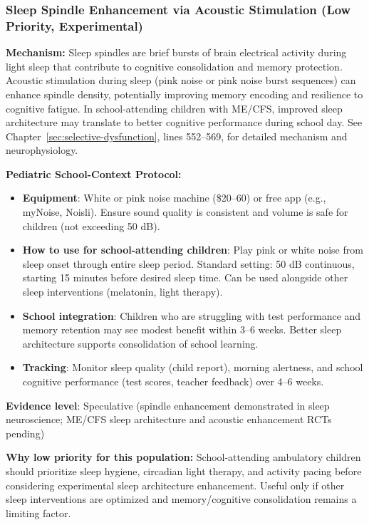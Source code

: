 \subsubsection{Sleep Spindle Enhancement via Acoustic Stimulation (Low Priority, Experimental)}

\begin{recommendation}
\label{rec:sleep-spindle-ped-ambulatory}

\textbf{Mechanism:} Sleep spindles are brief bursts of brain electrical activity during light sleep that contribute to cognitive consolidation and memory protection. Acoustic stimulation during sleep (pink noise or pink noise burst sequences) can enhance spindle density, potentially improving memory encoding and resilience to cognitive fatigue. In school-attending children with ME/CFS, improved sleep architecture may translate to better cognitive performance during school day. See Chapter~\ref{sec:selective-dysfunction}, lines 552--569, for detailed mechanism and neurophysiology.

\textbf{Pediatric School-Context Protocol:}

\begin{itemize}
    \item \textbf{Equipment}: White or pink noise machine (\$20--60) or free app (e.g., myNoise, Noisli). Ensure sound quality is consistent and volume is safe for children (not exceeding 50 dB).

    \item \textbf{How to use for school-attending children}: Play pink or white noise from sleep onset through entire sleep period. Standard setting: 50 dB continuous, starting 15 minutes before desired sleep time. Can be used alongside other sleep interventions (melatonin, light therapy).

    \item \textbf{School integration}: Children who are struggling with test performance and memory retention may see modest benefit within 3--6 weeks. Better sleep architecture supports consolidation of school learning.

    \item \textbf{Tracking}: Monitor sleep quality (child report), morning alertness, and school cognitive performance (test scores, teacher feedback) over 4--6 weeks.
\end{itemize}

\textbf{Evidence level}: Speculative (spindle enhancement demonstrated in sleep neuroscience; ME/CFS sleep architecture and acoustic enhancement RCTs pending)

\textbf{Why low priority for this population:} School-attending ambulatory children should prioritize sleep hygiene, circadian light therapy, and activity pacing before considering experimental sleep architecture enhancement. Useful only if other sleep interventions are optimized and memory/cognitive consolidation remains a limiting factor.

\end{recommendation}

